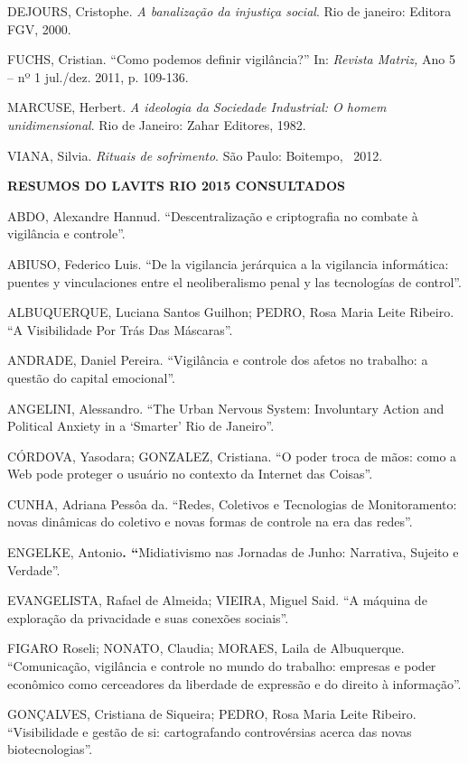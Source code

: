 DEJOURS, Cristophe. \emph{A banalização da injustiça social}. Rio de
janeiro: Editora FGV, 2000.

FUCHS, Cristian. ``Como podemos definir vigilância?'' In: \emph{Revista
Matriz,} Ano 5 -- nº 1 jul./dez. 2011, p. 109-136. ~

MARCUSE, Herbert. \emph{A ideologia da Sociedade Industrial: O homem
unidimensional}. Rio de Janeiro: Zahar Editores, 1982.

VIANA, Silvia. \emph{Rituais de sofrimento}. São Paulo: Boitempo, ~2012.

\textbf{RESUMOS DO LAVITS RIO 2015 CONSULTADOS}

ABDO, Alexandre Hannud. ``Descentralização e criptografia no combate à
vigilância e controle''.

ABIUSO, Federico Luis. ``De la vigilancia jerárquica a la vigilancia
informática: puentes y vinculaciones entre el neoliberalismo penal y las
tecnologías de control''.

ALBUQUERQUE, Luciana Santos Guilhon; PEDRO, Rosa Maria Leite Ribeiro.
``A Visibilidade Por Trás Das Máscaras''.

ANDRADE, Daniel Pereira. ``Vigilância e controle dos afetos no trabalho:
a questão do capital emocional''. ~

ANGELINI, Alessandro. ``The Urban Nervous System: Involuntary Action and
Political Anxiety in a `Smarter' Rio de Janeiro''.

CÓRDOVA, Yasodara; GONZALEZ, Cristiana. ``O poder troca de mãos: como a
Web pode proteger o usuário no contexto da Internet das Coisas''.

CUNHA, Adriana Pessôa da. ``Redes, Coletivos e Tecnologias de
Monitoramento: novas dinâmicas do coletivo e novas formas de controle na
era das redes''.

ENGELKE, Antonio\textbf{. ``}Midiativismo nas Jornadas de Junho:
Narrativa, Sujeito e Verdade''.

EVANGELISTA, Rafael de Almeida; VIEIRA, Miguel Said. ``A máquina de
exploração da privacidade e suas conexões sociais''.

FIGARO Roseli; NONATO, Claudia; MORAES, Laila de Albuquerque.
``Comunicação, vigilância e controle no mundo do trabalho: empresas e
poder econômico como cerceadores da liberdade de expressão e do direito
à informação''.

GONÇALVES, Cristiana de Siqueira; PEDRO, Rosa Maria Leite Ribeiro.
``Visibilidade e gestão de si: cartografando controvérsias acerca das
novas biotecnologias''.

